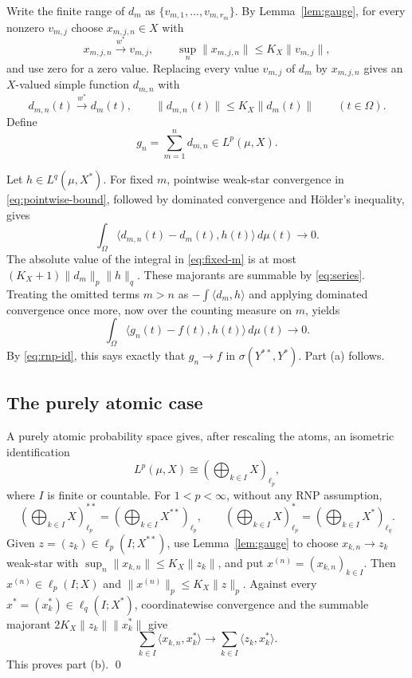 \documentclass[11pt]{article}
\newcommand{\wstar}{w^*}
\begin{document}
Write the finite range of $d_m$ as $\{v_{m,1},\dots,v_{m,r_m}\}$.  By
Lemma~\ref{lem:gauge}, for every nonzero $v_{m,j}$ choose
$x_{m,j,n}\in X$ with
\[
 x_{m,j,n}\xrightarrow{\wstar}v_{m,j},
 \qquad
 \sup_n\|x_{m,j,n}\|\leq K_X\|v_{m,j}\|,
\]
and use zero for a zero value.  Replacing every value $v_{m,j}$ of $d_m$ by
$x_{m,j,n}$ gives an $X$-valued simple function $d_{m,n}$ with
\begin{equation}\label{eq:pointwise-bound}
 d_{m,n}(t)\xrightarrow{\wstar}d_m(t),
 \qquad
 \|d_{m,n}(t)\|\leq K_X\|d_m(t)\|\qquad(t\in\Omega).
\end{equation}
Define
\begin{equation}\label{eq:gn}
 g_n=\sum_{m=1}^n d_{m,n}\in L^p(\mu,X).
\end{equation}

Let $h\in L^q(\mu,X^*)$.  For fixed $m$, pointwise weak-star convergence in
\eqref{eq:pointwise-bound}, followed by dominated convergence and H\"older's
inequality, gives
\begin{equation}\label{eq:fixed-m}
 \int_\Omega\langle d_{m,n}(t)-d_m(t),h(t)\rangle\,d\mu(t)
 \longrightarrow0.
\end{equation}
The absolute value of the integral in \eqref{eq:fixed-m} is at most
$(K_X+1)\|d_m\|_p\|h\|_q$.  These majorants are summable by
\eqref{eq:series}.  Treating the omitted terms $m>n$ as
$-\int\langle d_m,h\rangle$ and applying dominated convergence once more,
now over the counting measure on $m$, yields
\[
 \int_\Omega\langle g_n(t)-f(t),h(t)\rangle\,d\mu(t)\longrightarrow0.
\]
By \eqref{eq:rnp-id}, this says exactly that $g_n\to f$ in
$\sigma(Y^{**},Y^*)$.  Part (a) follows.

\subsection*{The purely atomic case}

A purely atomic probability space gives, after rescaling the atoms, an
isometric identification
\[
 L^p(\mu,X)\cong\left(\bigoplus_{k\in I}X\right)_{\ell_p},
\]
where $I$ is finite or countable.  For $1<p<\infty$, without any RNP
assumption,
\[
 \left(\bigoplus_{k\in I}X\right)_{\ell_p}^{**}
 =\left(\bigoplus_{k\in I}X^{**}\right)_{\ell_p},
 \qquad
 \left(\bigoplus_{k\in I}X\right)_{\ell_p}^{*}
 =\left(\bigoplus_{k\in I}X^*\right)_{\ell_q}.
\]
Given $z=(z_k)\in\ell_p(I;X^{**})$, use Lemma~\ref{lem:gauge} to choose
$x_{k,n}\to z_k$ weak-star with
$\sup_n\|x_{k,n}\|\leq K_X\|z_k\|$, and put
$x^{(n)}=(x_{k,n})_{k\in I}$.  Then $x^{(n)}\in\ell_p(I;X)$ and
$\|x^{(n)}\|_p\leq K_X\|z\|_p$.  Against every
$x^*=(x_k^*)\in\ell_q(I;X^*)$, coordinatewise convergence and the summable
majorant $2K_X\|z_k\|\|x_k^*\|$ give
\[
 \sum_{k\in I}\langle x_{k,n},x_k^*\rangle
 \longrightarrow
 \sum_{k\in I}\langle z_k,x_k^*\rangle.
\]
This proves part (b).  \qed
\end{document}
